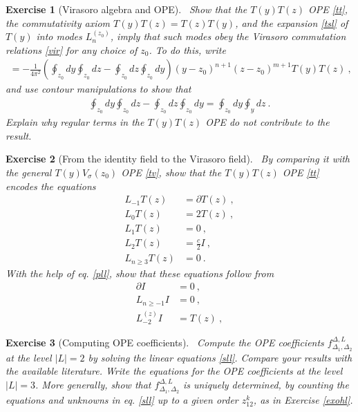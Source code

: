 \documentclass[12pt, a4paper, notitlepage, twoside]{report}
\numberwithin{equation}{section}
\theoremstyle{break}
\newtheorem{exo}{Exercise}[chapter]
\begin{document}
\begin{exo}[Virasoro algebra and OPE] 
~\label{exott}
Show that the $T(y)T(z)$ OPE \eqref{tt}, the commutativity axiom $T(y)T(z) = T(z)T(y)$, and the expansion \eqref{tsl} of $T(y)$ into modes $L_n^{(z_0)}$, imply that such modes obey the Virasoro commutation relations \eqref{vir} for any choice of $z_0$.
To do this, write 
\begin{align}
 [L_n^{(z_0)},L_m^{(z_0)}] = -\frac{1}{4\pi^2} \left(\oint_{z_0} dy \oint_{z_0} dz - \oint_{z_0} dz \oint_{z_0} dy\right) (y-z_0)^{n+1}(z-z_0)^{m+1} T(y)T(z)\ ,
\end{align}
and use contour manipulations to show that 
\begin{align}
 \oint_{z_0} dy \oint_{z_0} dz - \oint_{z_0} dz \oint_{z_0} dy = \oint_{z_0} dy \oint_y dz\ .
\end{align}
Explain why regular terms in the $T(y)T(z)$ OPE do not contribute to the result.
\end{exo}

\begin{exo}[From the identity field to the Virasoro field]
 ~\label{exoit}
By comparing it with the general $T(y)V_\sigma(z_0)$ OPE \eqref{tv}, show that the $T(y)T(z)$ OPE \eqref{tt} encodes the equations
\begin{align}
 L_{-1}T(z) &= \partial T(z) \ ,
\label{lmt}
\\
L_0 T(z) &= 2 T(z)\ ,
\\
L_1 T(z) &= 0 \ ,
\\
L_2 T(z) &= \frac{c}{2} I\ ,
\\
L_{n\geq 3} T(z) &= 0 \ .
\label{lgt}
\end{align}
With the help of eq. \eqref{pll}, show that these equations follow from 
\begin{align}
 \partial I & = 0\ ,
\label{piz}
\\
 L_{n\geq -1} I& = 0\ ,
\\
L_{-2}^{(z)}I & = T(z)\ ,
\label{let}
\end{align}
\end{exo}

\begin{exo}[Computing OPE coefficients]
 ~\label{exohf}
Compute the OPE coefficients $f^{\Delta,L}_{\Delta_1,\Delta_2}$ at the level $|L|= 2$ by solving the linear equations \eqref{sll}.
Compare your results with the available literature.
Write the equations for the OPE coefficients at the level $|L|=3$. 
More generally, show that $f^{\Delta,L}_{\Delta_1,\Delta_2}$ is uniquely determined, 
by counting the equations and unknowns in eq. \eqref{sll} up to a given order $z_{12}^k$, as in Exercise \ref{exohl}.
\end{exo}
\end{document}
